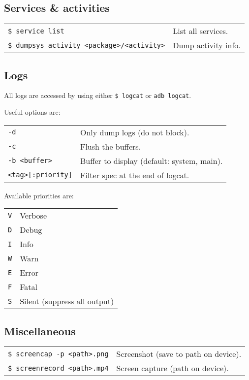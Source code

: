 \documentclass[11pt,landscape,a4paper]{article}
\begin{document}
\begin{multicols}{3}
\subsection{Services \& activities}
\begin{tabular}{@{}ll@{}}
\texttt{\$ service list} & List all services.\\
\texttt{\$ dumpsys activity <package>/<activity>} & Dump activity info.\\
\end{tabular}

\subsection{Logs}

All logs are accessed by using either \texttt{\$ logcat} or \texttt{adb logcat}. 

\vspace*{2mm}

Useful options are:

\begin{tabular}{@{}ll@{}}
\texttt{-d} & Only dump logs (do not block).\\
\texttt{-c} & Flush the buffers.\\
\texttt{-b <buffer>} & Buffer to display (default: system, main).\\
\texttt{<tag>[:priority]} & Filter spec at the end of logcat.\\
\end{tabular}

\vspace*{2mm}

Available priorities are:

\begin{addmargin}{10mm}
\begin{tabular}{@{}ll@{}}
\texttt{V} & Verbose\\
\texttt{D} & Debug\\
\texttt{I} & Info\\
\texttt{W} & Warn\\
\texttt{E} & Error\\
\texttt{F} & Fatal\\
\texttt{S} & Silent (suppress all output)\\
\end{tabular}
\end{addmargin}


\subsection{Miscellaneous}
\begin{tabular}{@{}ll@{}}
\texttt{\$ screencap -p <path>.png} & Screenshot (save to path on device).\\
\texttt{\$ screenrecord <path>.mp4} & Screen capture (path on device).\\
\end{tabular}


\end{multicols}
\end{document}

